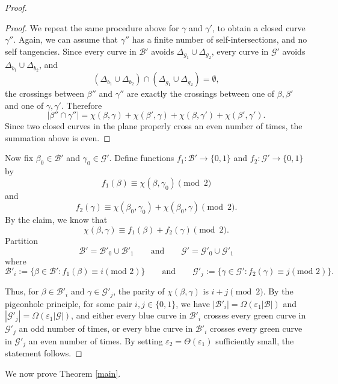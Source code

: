 \documentclass[11pt]{article}
\theoremstyle{plain}
\theoremstyle{definition}
\theoremstyle{remark}
\begin{document}
\begin{proof}
\begin{proof}
We repeat the same procedure above for $\gamma$ and $\gamma'$, to obtain a
closed curve $\gamma''$. Again, we can assume that $\gamma''$ has a finite
number of self-intersections, and no self tangencies. Since every curve in
\(\mathcal B'\) avoids \(\Delta_{g_1}\cup\Delta_{g_2}\), every curve in
\(\mathcal G'\) avoids \(\Delta_{b_1}\cup\Delta_{b_2}\), and
\[
(\Delta_{b_1}\cup\Delta_{b_2})\cap
(\Delta_{g_1}\cup\Delta_{g_2})=\emptyset,
\]
the crossings between \(\beta''\) and \(\gamma''\) are exactly the crossings
between one of \(\beta,\beta'\) and one of \(\gamma,\gamma'\). Therefore
\[
|\beta''\cap\gamma''|
=
\chi(\beta,\gamma)+\chi(\beta',\gamma)+\chi(\beta,\gamma')
+\chi(\beta',\gamma').
\]
Since two closed curves in the plane properly cross an even number of times,
the summation above is even.\end{proof}





Now fix \(\beta_0\in\mathcal B'\) and \(\gamma_0\in\mathcal G'\). Define functions \(f_1:\mathcal B'\to  \{0,1\}\) and \(f_2:\mathcal G'\to\{0,1\}\) by
\[
f_1(\beta)\equiv \chi(\beta,\gamma_0)\pmod 2
\]
and
\[
f_2(\gamma)\equiv \chi(\beta_0,\gamma_0)+\chi(\beta_0,\gamma)\pmod 2.
\]
By the claim, we know that 
\[
\chi(\beta,\gamma) \equiv f_1(\beta)+f_2(\gamma) \pmod 2. 
\]
Partition 
\[
\mathcal{B}'=\mathcal{B}'_0 \cup \mathcal{B}'_1
\qquad\text{and}\qquad
\mathcal{G}'=\mathcal{G}'_0 \cup \mathcal{G}'_1
\]
where 
\[
\mathcal{B}'_i:=\{\beta \in \mathcal{B}': f_1(\beta)\equiv i (\text{mod } 2)\}
\qquad\text{and}\qquad
\mathcal{G}'_j:=\{\gamma \in \mathcal{G}': f_2(\gamma)\equiv j (\text{mod } 2)\}. 
\]


Thus, for \(\beta\in\mathcal B'_i\) and \(\gamma\in\mathcal G'_j\), the parity of \(\chi(\beta,\gamma)\) is \(i+j\pmod 2\).   By the pigeonhole principle, for some pair \(i,j\in\{0,1\}\), we have $|\mathcal{B}'_i|=\Omega(\varepsilon_1|\mathcal B|)$ and $|\mathcal{G}'_j| =\Omega (\varepsilon_1|\mathcal G|)$, and either every blue curve in $\mathcal{B}'_i$ crosses every green curve in $\mathcal{G}'_j$ an odd number of times, or every blue curve in $\mathcal{B}'_i$ crosses every green curve in $\mathcal{G}'_j$ an even number of times.  By setting $\varepsilon_2 = \Theta(\varepsilon_1)$ sufficiently small, the statement follows.\end{proof}

 
\noindent We now prove Theorem \ref{main}.
 
\end{document}
